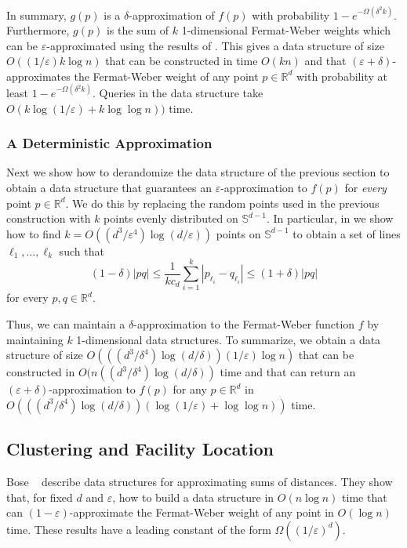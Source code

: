 \documentclass[charterfonts,lotsofwhite]{patmorin}
\newcommand{\eps}{\varepsilon}
\begin{document}
In summary, $g(p)$ is a $\delta$-approximation of $f(p)$ with
probability $1-e^{-\Omega(\delta^2k)}$.  Furthermore, $g(p)$ is the
sum of $k$ 1-dimensional Fermat-Weber weights which can be
$\eps$-approximated using the results of .  This gives a
data structure of size $O((1/\eps)k\log n)$ that can be constructed in
time $O(kn)$ and that $(\eps+\delta)$-approximates the Fermat-Weber
weight of any point $p\in\mathbb{R}^d$ with probability at least
$1-e^{-\Omega(\delta^2k)}$.  Queries in the data structure take
$O(k\log(1/\eps)+k\log\log n))$ time.


\subsubsection{A Deterministic Approximation}

Next we show how to derandomize the data structure of the previous
section to obtain a data structure that guarantees an
$\eps$-approximation to $f(p)$ for \emph{every} point
$p\in\mathbb{R}^d$.  
We do this by replacing the random points used in the previous
construction with 
$k$ points evenly distributed on $\mathbb{S}^{d-1}$.  In particular,
in  we show how to find
$k=O((d^3/\eps^4)\log (d/\eps))$ points on $\mathbb{S}^{d-1}$ 
to obtain a set of lines $\ell_1,\ldots,\ell_k$ such that
\[
      (1-\delta)|pq|\le \frac{1}{kc_d} \sum_{i=1}^k |p_{\ell_i}-q_{\ell_i}| 
      \le (1+\delta)|pq| 
\]
for every $p,q\in\mathbb{R}^d$.

Thus, we can maintain a $\delta$-approximation to the Fermat-Weber
function $f$ by maintaining $k$ 1-dimensional data structures.  To
summarize, we obtain a data structure of size
$O(((d^3/\delta^{4})\log(d/\delta))(1/\eps)\log n)$ that can be constructed in
$O(n((d^3/\delta^4)\log(d/\delta))$ time and that can return an
$(\eps+\delta)$-approximation to $f(p)$ for any $p\in\mathbb{R}^d$ in
$O(((d^3/\delta^{4})\log (d/\delta))(\log(1/\eps) + \log\log n))$ time.

\subsection{Clustering and Facility Location}

Bose \etal\ \cite{bmm02} describe data structures for approximating
sums of distances.  They show that, for fixed $d$ and $\eps$, how to
build a data structure in $O(n\log n)$ time that can
$(1-\eps)$-approximate the Fermat-Weber weight of any point in $O(\log
n)$ time.  These results have a leading constant of the form
$\Omega((1/\eps)^d)$.
\end{document}
